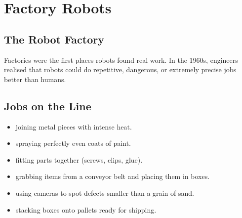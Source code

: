 
\chapter{Factory Robots}


\section*{The Robot Factory}

Factories were the first places robots found real work. In the 1960s,
engineers realised that robots could do repetitive, dangerous, or
extremely precise jobs better than humans.


\sectionrule

\section*{Jobs on the Line}

\begin{itemize}
  \item {} \textemdash{} joining metal pieces with intense heat.
  \item {} \textemdash{} spraying perfectly even coats of paint.
  \item {} \textemdash{} fitting parts together (screws, clips, glue).
  \item {} \textemdash{} grabbing items from a conveyor belt and placing them in boxes.
  \item {} \textemdash{} using cameras to spot defects smaller than a grain of sand.
  \item {} \textemdash{} stacking boxes onto pallets ready for shipping.
\end{itemize}

